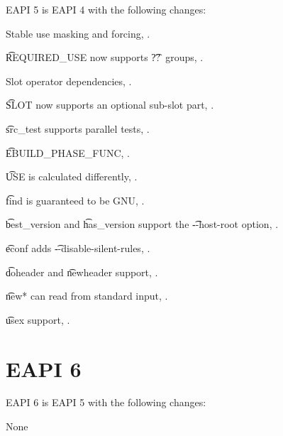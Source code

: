 EAPI 5 is EAPI 4 with the following changes:

\begin{compactitem}
\item Stable use masking and forcing, .
\item \t{REQUIRED\_USE} now supports \t{??}\ groups, .
\item Slot operator dependencies, .
\item \t{SLOT} now supports an optional sub-slot part, .
\item \t{src\_test} supports parallel tests, .
\item \t{EBUILD\_PHASE\_FUNC}, .
\item \t{USE} is calculated differently, .
\item \t{find} is guaranteed to be GNU, .
\item \t{best\_version} and \t{has\_version} support the \t{-{}-host-root} option,
    .
\item \t{econf} adds \t{-{}-disable-silent-rules}, .
\item \t{doheader} and \t{newheader} support, .
\item \t{new*} can read from standard input, .
\item \t{usex} support, .
\end{compactitem}

\section*{EAPI 6}

EAPI 6 is EAPI 5 with the following changes:

\begin{compactitem}
\item None
\end{compactitem}



